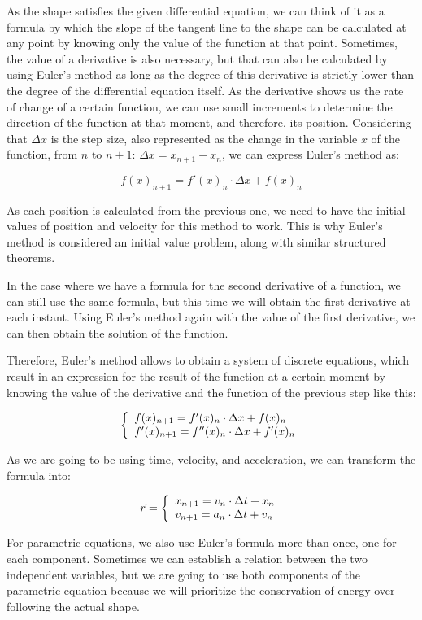 \documentclass[12pt,twoside,a4paper]{article}
\begin{document}
	As the shape satisfies the given differential equation, we can think of it as a formula by which the slope of the tangent line to the shape can be calculated at any point by knowing only the value of the function at that point. Sometimes, the value of a derivative is also necessary, but that can also be calculated by using Euler's method as long as the degree of this derivative is strictly lower than the degree of the differential equation itself. As the derivative shows us the rate of change of a certain function, we can use small increments to determine the direction of the function at that moment, and therefore, its position. Considering that $\Delta x$ is the step size, also represented as the change in the variable $x$ of the function, from $n$ to $n + 1$: $\Delta x = x_{n + 1} - x_n$, we can express Euler's method as:
	
	$$\boxed{f(x)_{n + 1} = f'(x)_n \cdot \Delta x + f(x)_n}$$
	
	As each position is calculated from the previous one, we need to have the initial values of position and velocity for this method to work. This is why Euler's method is considered an initial value problem, along with similar structured theorems.
	
	In the case where we have a formula for the second derivative of a function, we can still use the same formula, but this time we will obtain the first derivative at each instant. Using Euler's method again with the value of the first derivative, we can then obtain the solution of the function.
	
	Therefore, Euler's method allows to obtain a system of discrete equations, which result in an expression for the result of the function at a certain moment by knowing the value of the derivative and the function of the previous step like this:
	
	$$\left\{\begin{array}{l} f(x)_{n + 1} = f'(x)_n \cdot \Delta x + f(x)_n \cr f'(x)_{n + 1} = f''(x)_n \cdot \Delta x + f'(x)_n \end{array}\right.$$
	
	As we are going to be using time, velocity, and acceleration, we can transform the formula into:
	
	$$\vec{r} = \left\{\begin{array}{l}
		x_{n + 1} = v_n \cdot \Delta t + x_n \cr
		v_{n + 1} = a_n \cdot \Delta t + v_n
	\end{array}\right.$$
	
	For parametric equations, we also use Euler's formula more than once, one for each component. Sometimes we can establish a relation between the two independent variables, but we are going to use both components of the parametric equation because we will prioritize the conservation of energy over following the actual shape.
	
\end{document}
